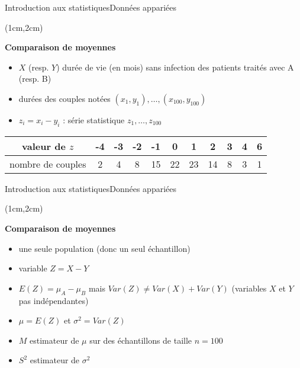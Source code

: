 \documentclass{beamer}
\begin{document}
 

\begin{frame}{Introduction aux statistiques}{Données appariées}
\begin{textblock*}{\textwidth}(1cm,2cm)

\begin{center}{\bf \Large Comparaison de moyennes } \end{center}



 
 \begin{itemize}
 \item $X$ (resp. $Y$) durée de vie (en mois) sans infection  des patients traités avec A (resp. B)
\item durées  des couples  notées $(x_1,y_1),\hdots,(x_{100},y_{100})$ 
\item $z_i=x_i-y_i$ :  série statistique $z_1,\hdots,z_{100}$
 \end{itemize}


\begin{center}
\begin{tabular}{|c|c|c|c|c|c|c|c|c|c|c|}
\hline
valeur de $z$ & -4 & -3 & -2 & -1 & 0 & 1 & 2 & 3 & 4 & 6 \\
\hline
nombre de couples & 2 & 4 & 8 & 15 & 22 & 23 & 14 & 8 & 3 & 1 \\
\hline
\end{tabular}
\end{center}

\end{textblock*}

\end{frame}



\begin{frame}{Introduction aux statistiques}{Données appariées}
\begin{textblock*}{\textwidth}(1cm,2cm)

\begin{center}{\bf \Large Comparaison de moyennes } \end{center}



 
 \begin{itemize}
 \item une seule population (donc un seul échantillon) 
 \item variable  $Z=X-Y$
 \item $E(Z) = \mu_A - \mu_B$ mais  $Var(Z) \not= Var(X) + Var(Y)$ (variables $X$ et $Y$  pas indépendantes)
 \item $\mu=E(Z)$ et $\sigma^2=Var(Z)$
 \item $M$ estimateur de $\mu$ sur des échantillons de taille $n=100$ 
 \item $S^2$ estimateur de  $\sigma^2$ 
 \end{itemize}



\end{textblock*}

\end{frame}
\end{document}
